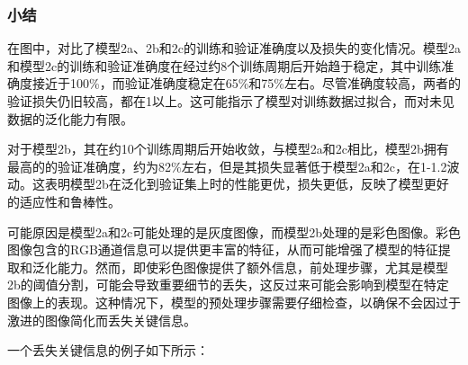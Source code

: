 \subsubsection{小结}
在图中，对比了模型2a、2b和2c的训练和验证准确度以及损失的变化情况。模型2a和模型2c的训练和验证准确度在经过约8个训练周期后开始趋于稳定，其中训练准确度接近于100\%，而验证准确度稳定在65\%和75\%左右。尽管准确度较高，两者的验证损失仍旧较高，都在1以上。这可能指示了模型对训练数据过拟合，而对未见数据的泛化能力有限。

对于模型2b，其在约10个训练周期后开始收敛，与模型2a和2c相比，模型2b拥有最高的的验证准确度，约为82\%左右，但是其损失显著低于模型2a和2c，在1-1.2波动。这表明模型2b在泛化到验证集上时的性能更优，损失更低，反映了模型更好的适应性和鲁棒性。

可能原因是模型2a和2c可能处理的是灰度图像，而模型2b处理的是彩色图像。彩色图像包含的RGB通道信息可以提供更丰富的特征，从而可能增强了模型的特征提取和泛化能力。然而，即使彩色图像提供了额外信息，前处理步骤，尤其是模型2b的阈值分割，可能会导致重要细节的丢失，这反过来可能会影响到模型在特定图像上的表现。这种情况下，模型的预处理步骤需要仔细检查，以确保不会因过于激进的图像简化而丢失关键信息。

一个丢失关键信息的例子如下所示：

